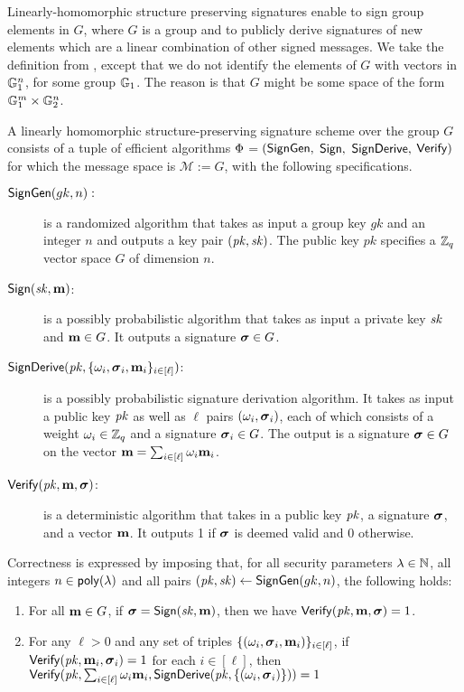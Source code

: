 \label{def:splh}
Linearly-homomorphic structure preserving signatures  \cite{C:AFGHO10,PKC:BFKW09} enable to sign group elements 
in $G$, where $G$ is a group and to publicly derive signatures of new elements which are a linear combination of other signed messages. We take the definition from \cite{C:LPJY13}, except that we do not identify the elements of $G$ with vectors in $\mathbb{G}_1^n$, for some group $\mathbb{G}_1$. The reason is that $G$ might be some space of the form $\mathbb{G}_1^m \times \mathbb{G}_2^n$. 

\begin{definition}
A linearly homomorphic structure-preserving signature scheme over the group $G$  consists
of a tuple of efficient algorithms $\Phi$$=$$(\mathsf{SignGen},$ $\mathsf{Sign},$ $\mathsf{SignDerive},$ $\mathsf{Verify})$ for which the message space
is $\mathcal{M} := G$, with the following specifications.

\begin{description}

\item[$\mathsf{SignGen}(gk, n):$] is a randomized algorithm that takes as input a group key $gk$ and an integer $n$ and  outputs a key pair $(\mathit{pk}, \mathit{sk})$. The public key $pk$ specifies a $\mathbb{Z}_q$ vector space $G$ of dimension $n$. 

\item[$\mathsf{Sign}(\mathit{sk},\mathbf{m})$:] is a possibly probabilistic algorithm that takes as input a private key $\mathit{sk}$
 and $\mathbf{m}\in G$. It outputs a signature ${\boldsymbol \sigma}\in G$.

\item[$\mathsf{SignDerive}(\mathit{pk},\{\omega_i,{\boldsymbol \sigma}_i,\mathbf{m}_i \}_{i\in[\ell]})$:] is a possibly probabilistic signature derivation algorithm. It
takes as input a public key $\mathit{pk}$ as well as $\ell$ pairs $(\omega_i,{\boldsymbol \sigma}_i)$, each of which
consists of a weight $\omega_i\in\mathbb{Z}_q$ and a signature ${\boldsymbol \sigma_i}\in G$. The output is a signature
${\boldsymbol \sigma}\in G$ on the vector $\mathbf{m} = \sum_{i\in[\ell]} \omega_i\mathbf{m}_i $.

\item[$\mathsf{Verify}(\mathit{pk}, \mathbf{m},  {\boldsymbol \sigma})$:] is a deterministic algorithm that takes in a public key $\mathit{pk}$,
a signature ${\boldsymbol \sigma}$, and a vector $\mathbf{m}$. It outputs 1 if ${\boldsymbol \sigma}$ is deemed valid and 0 otherwise.
\end{description}
\end{definition}

Correctness is expressed by imposing that, for all security parameters $\lambda\in\mathbb{N}$, all integers $n\in\mathsf{poly}(\lambda)$
and all pairs $(\mathit{pk},\mathit{sk}) \gets \mathsf{SignGen}(gk, n)$, the following holds:
\begin{enumerate}
\item For all $\mathbf{m} \in G$, if ${\boldsymbol \sigma} = \mathsf{Sign}(\mathit{sk}, \mathbf{m})$, then we have $\mathsf{Verify}(\mathit{pk}, \mathbf{m}, {\boldsymbol \sigma}) = 1$.
\item For any $\ell > 0$ and any set of triples $\{(\omega_i, {\boldsymbol \sigma}_i, \mathbf{m}_i)\}_{i\in[\ell]}$,
if $\mathsf{Verify}(\mathit{pk}, \mathbf{m}_i, {\boldsymbol \sigma}_i) = 1$ for each $i \in [\ell]$, then
$\mathsf{Verify}(
    \mathit{pk},
    \sum_{i\in[\ell]} \omega_i\mathbf{m}_i,
    \mathsf{SignDerive}(
        \mathit{pk},
        \{(\omega_i, {\boldsymbol \sigma}_i)\}
        )
    )=1
$
\end{enumerate}

